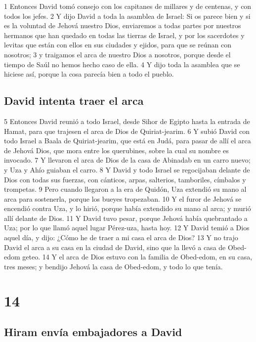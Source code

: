 1 Entonces David tomó consejo con los capitanes de millares y de centenas, y con todos los jefes.
2 Y dijo David a toda la asamblea de Israel: Si os parece bien y si es la voluntad de Jehová nuestro Dios, enviaremos a todas partes por nuestros hermanos que han quedado en todas las tierras de Israel, y por los sacerdotes y levitas que están con ellos en sus ciudades y ejidos, para que se reúnan con nosotros;
3 y traigamos el arca de nuestro Dios a nosotros, porque desde el tiempo de Saúl no hemos hecho caso de ella.
4 Y dijo toda la asamblea que se hiciese así, porque la cosa parecía bien a todo el pueblo.

\section*{David intenta traer el arca}

5 Entonces David reunió a todo Israel, desde Sihor de Egipto hasta la entrada de Hamat, para que trajesen el arca de Dios de Quiriat-jearim. 
6 Y subió David con todo Israel a Baala de Quiriat-jearim, que está en Judá, para pasar de allí el arca de Jehová Dios, que mora entre los querubines, sobre la cual su nombre es invocado.
7 Y llevaron el arca de Dios de la casa de Abinadab en un carro nuevo; y Uza y Ahío guiaban el carro.
8 Y David y todo Israel se regocijaban delante de Dios con todas sus fuerzas, con cánticos, arpas, salterios, tamboriles, címbalos y trompetas.
9 Pero cuando llegaron a la era de Quidón, Uza extendió su mano al arca para sostenerla, porque los bueyes tropezaban.
10 Y el furor de Jehová se encendió contra Uza, y lo hirió, porque había extendido su mano al arca; y murió allí delante de Dios.
11 Y David tuvo pesar, porque Jehová había quebrantado a Uza; por lo que llamó aquel lugar Pérez-uza, hasta hoy.
12 Y David temió a Dios aquel día, y dijo: ¿Cómo he de traer a mi casa el arca de Dios?
13 Y no trajo David el arca a su casa en la ciudad de David, sino que la llevó a casa de Obed-edom geteo.
14 Y el arca de Dios estuvo con la familia de Obed-edom, en su casa, tres meses; y bendijo Jehová la casa de Obed-edom, y todo lo que tenía.

\chapter{14}

\section*{Hiram envía embajadores a David}

